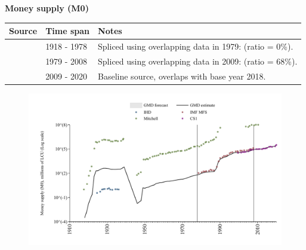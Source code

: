 \documentclass[12pt,a4paper,landscape]{article}
\begin{document}
\begin{adjustbox}{max totalsize={\paperwidth}{\paperheight},center}
\begin{minipage}[t][\textheight][t]{\textwidth}
\vspace*{0.5cm}
{}
\begin{center}
{\Large\bfseries Money supply (M0)}
\end{center}
\vspace{0.5cm}
\begin{table}[H]
\centering
\small
\begin{tabular}{|l|l|l|}
\hline
\textbf{Source} & \textbf{Time span} & \textbf{Notes} \\
\hline
\rowcolor{white}\cite{Mitchell}& 1918 - 1978 &Spliced using overlapping data in 1979: (ratio = 0\%). \\
\rowcolor{lightgray}\cite{IMF_MFS}& 1979 - 2008 &Spliced using overlapping data in 2009: (ratio = 68\%). \\
\rowcolor{white}\cite{CS1_POL}& 2009 - 2020 &Baseline source, overlaps with base year 2018. \\
\hline
\end{tabular}
\end{table}
\begin{figure}[H]
\centering
\includegraphics[width=\textwidth,height=0.6\textheight,keepaspectratio]{graphs/POL_M0.pdf}
\end{figure}
\end{minipage}
\end{adjustbox}
\end{document}
